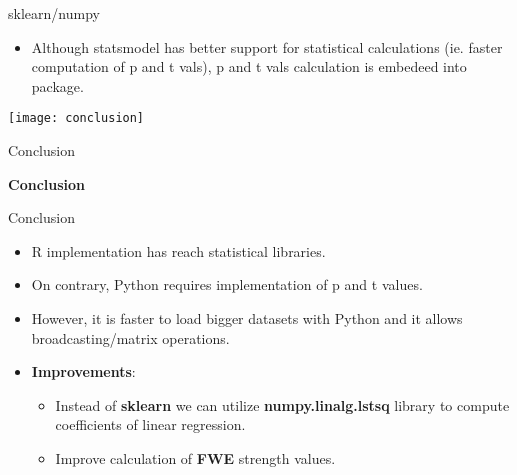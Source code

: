 \documentclass[english,aspectratio=169]{beamer}
\begin{document}
\begin{frame}{sklearn/numpy}
    \begin{itemize}
        \item Although statsmodel has better support for statistical calculations (ie. faster computation of p and t vals), p and t vals calculation is embedeed into package.
    \end{itemize}

    \begin{center}
        \texttt{[image: conclusion]}
    \end{center}
\end{frame}


\begin{frame}{Conclusion}%

  \begin{center}
        \textbf{\Large Conclusion}
  \end{center}

\end{frame}

\begin{frame}{Conclusion}%

  \begin{itemize}
      \item R implementation has reach statistical libraries.
      \item On contrary, Python requires implementation of p and t values.
      \item However, it is faster to load bigger datasets with Python and it allows broadcasting/matrix operations.
      \item \textbf{Improvements}:
      \begin{itemize}
          \item Instead of \textbf{sklearn} we can utilize \textbf{numpy.linalg.lstsq} library to compute coefficients of linear regression.
          \item Improve calculation of \textbf{FWE} strength values.
      \end{itemize}
  \end{itemize}

\end{frame}
\end{document}
